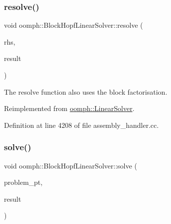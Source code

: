 \mbox{\label{classoomph_1_1BlockHopfLinearSolver_a2c0e342f253917e987f8504b16862b2c}} 
\subsubsection{\texorpdfstring{resolve()}{resolve()}}
{\footnotesize\ttfamily void oomph\+::\+Block\+Hopf\+Linear\+Solver\+::resolve (\begin{DoxyParamCaption}\item[{const \hyperlink{classoomph_1_1DoubleVector}{Double\+Vector} \&}]{rhs,  }\item[{\hyperlink{classoomph_1_1DoubleVector}{Double\+Vector} \&}]{result }\end{DoxyParamCaption})\hspace{0.3cm}{\ttfamily [virtual]}}



The resolve function also uses the block factorisation. 



Reimplemented from \hyperlink{classoomph_1_1LinearSolver_a3b310d08333033edc119b2a5bd7dcbfb}{oomph\+::\+Linear\+Solver}.



Definition at line 4208 of file assembly\+\_\+handler.\+cc.

\mbox{\label{classoomph_1_1BlockHopfLinearSolver_a5e9ff24466ec138cca8264e5befc31fe}} 
\subsubsection{\texorpdfstring{solve()}{solve()}\hspace{0.1cm}{\footnotesize\ttfamily [1/3]}}
{\footnotesize\ttfamily void oomph\+::\+Block\+Hopf\+Linear\+Solver\+::solve (\begin{DoxyParamCaption}\item[{\hyperlink{classoomph_1_1Problem}{Problem} $\ast$const \&}]{problem\+\_\+pt,  }\item[{\hyperlink{classoomph_1_1DoubleVector}{Double\+Vector} \&}]{result }\end{DoxyParamCaption})\hspace{0.3cm}{\ttfamily [virtual]}}



